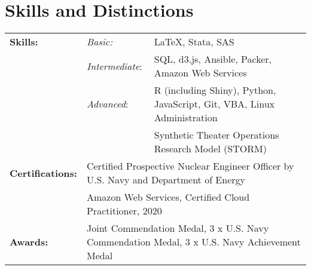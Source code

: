 \documentclass{article}
\begin{document}
\section{Skills and Distinctions}
\begin{tabular}{@{} l  l  l}
	\textbf{Skills:} 		& \textit{Basic:} 			& \LaTeX, Stata, SAS \\
							& \textit{Intermediate}: 	& SQL, d3.js, Ansible, Packer, Amazon Web Services\\
							& \textit{Advanced}:		& R (including Shiny), Python, JavaScript, Git, VBA, Linux Administration \\
							&                        & Synthetic Theater Operations Research Model (STORM) \\
	\textbf{Certifications:} 	& \multicolumn{2}{p{16.5cm}}{\textendash Certified Prospective Nuclear Engineer Officer by U.S. Navy and Department of Energy} \\
	                          & \multicolumn{2}{p{16.5cm}}{\textendash Amazon Web Services, Certified Cloud Practitioner, 2020} \\
	\textbf{Awards:}			& \multicolumn{2}{p{16.5cm}}{Joint Commendation Medal, 3 x U.S. Navy Commendation Medal, 3 x U.S. Navy Achievement Medal} \\
	
\end{tabular}
\end{document}
